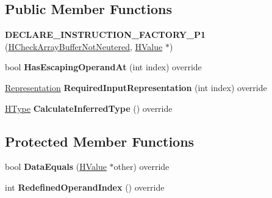 \subsection*{Public Member Functions}
\begin{DoxyCompactItemize}
\item 
{\bfseries D\+E\+C\+L\+A\+R\+E\+\_\+\+I\+N\+S\+T\+R\+U\+C\+T\+I\+O\+N\+\_\+\+F\+A\+C\+T\+O\+R\+Y\+\_\+\+P1} (\hyperlink{classv8_1_1internal_1_1_h_check_array_buffer_not_neutered}{H\+Check\+Array\+Buffer\+Not\+Neutered}, \hyperlink{classv8_1_1internal_1_1_h_value}{H\+Value} $\ast$)\hypertarget{classv8_1_1internal_1_1_h_check_array_buffer_not_neutered_a7fe4a777edf68904612414bc1b9ae065}{}\label{classv8_1_1internal_1_1_h_check_array_buffer_not_neutered_a7fe4a777edf68904612414bc1b9ae065}

\item 
bool {\bfseries Has\+Escaping\+Operand\+At} (int index) override\hypertarget{classv8_1_1internal_1_1_h_check_array_buffer_not_neutered_a21c7a69155bca64ff718e04e6947ee3c}{}\label{classv8_1_1internal_1_1_h_check_array_buffer_not_neutered_a21c7a69155bca64ff718e04e6947ee3c}

\item 
\hyperlink{classv8_1_1internal_1_1_representation}{Representation} {\bfseries Required\+Input\+Representation} (int index) override\hypertarget{classv8_1_1internal_1_1_h_check_array_buffer_not_neutered_aee2881b11d247859024e47ea00d6dda4}{}\label{classv8_1_1internal_1_1_h_check_array_buffer_not_neutered_aee2881b11d247859024e47ea00d6dda4}

\item 
\hyperlink{classv8_1_1internal_1_1_h_type}{H\+Type} {\bfseries Calculate\+Inferred\+Type} () override\hypertarget{classv8_1_1internal_1_1_h_check_array_buffer_not_neutered_ae5af17013af3c01e2a758d332ca72a9e}{}\label{classv8_1_1internal_1_1_h_check_array_buffer_not_neutered_ae5af17013af3c01e2a758d332ca72a9e}

\end{DoxyCompactItemize}
\subsection*{Protected Member Functions}
\begin{DoxyCompactItemize}
\item 
bool {\bfseries Data\+Equals} (\hyperlink{classv8_1_1internal_1_1_h_value}{H\+Value} $\ast$other) override\hypertarget{classv8_1_1internal_1_1_h_check_array_buffer_not_neutered_ab60e606367d75324f52638384d4b0beb}{}\label{classv8_1_1internal_1_1_h_check_array_buffer_not_neutered_ab60e606367d75324f52638384d4b0beb}

\item 
int {\bfseries Redefined\+Operand\+Index} () override\hypertarget{classv8_1_1internal_1_1_h_check_array_buffer_not_neutered_adc9d6c17264545af71486d80956fd6d2}{}\label{classv8_1_1internal_1_1_h_check_array_buffer_not_neutered_adc9d6c17264545af71486d80956fd6d2}

\end{DoxyCompactItemize}
